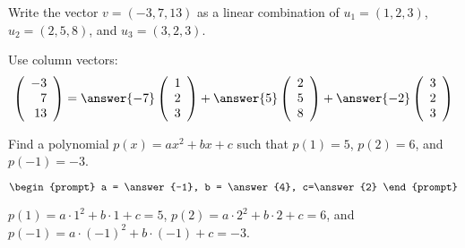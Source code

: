 \documentclass{ximera}
\begin{document}
\begin{exercise}

\noindent Write the vector $v=(-3,7,13)$ as a linear combination of $u_1=(1,2,3)$, $u_2=(2,5,8)$, and $u_3=(3,2,3)$.  

\begin{prompt}
Use column vectors: 
\[
\left(\begin{array}{r} -3 \\ 7 \\ 13 \end{array} \right) 
= \answer{-7}\left(\begin{array}{r} 1 \\ 2 \\ 3 \end{array} \right) 
+ \answer{5}\left(\begin{array}{r} 2 \\ 5 \\ 8 \end{array} \right) 
+ \answer{-2}\left(\begin{array}{r} 3 \\ 2 \\ 3 \end{array} \right)
\]
\end{prompt}

\end{exercise}

\problemlabel

\noindent Find a polynomial $p(x) = ax^2+bx+c$ such that $p(1)=5$, $p(2)=6$, and $p(-1)=-3$.    


\begin{exercise}

$\begin{prompt}
a = \answer{-1}, b = \answer{4}, c=\answer{2}
\end{prompt}$

\begin{hint}
$p(1) = a\cdot 1^2+b\cdot 1 + c =5$,  
$p(2) = a\cdot 2^2+b\cdot 2 + c =6$, and   
$p(-1) = a\cdot(-1)^2+b\cdot(-1) + c =-3$. 
\end{hint}

\end{exercise}
\end{document}
